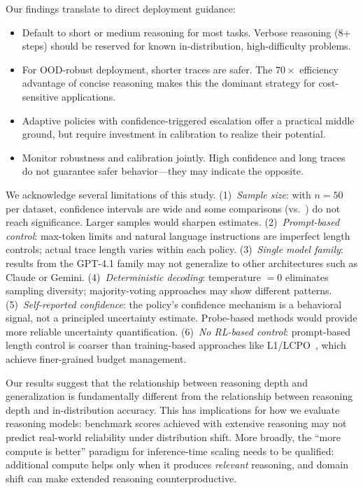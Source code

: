 Our findings translate to direct deployment guidance:
\begin{itemize}[leftmargin=*,itemsep=0pt,topsep=0pt]
    \item Default to short or medium reasoning for most tasks. Verbose reasoning (8+ steps) should be reserved for known in-distribution, high-difficulty problems.
    \item For OOD-robust deployment, shorter traces are safer. The $70\times$ efficiency advantage of concise reasoning makes this the dominant strategy for cost-sensitive applications.
    \item Adaptive policies with confidence-triggered escalation offer a practical middle ground, but require investment in calibration to realize their potential.
    \item Monitor robustness and calibration jointly. High confidence and long traces do not guarantee safer behavior---they may indicate the opposite.
\end{itemize}

We acknowledge several limitations of this study. (1)~\emph{Sample size}: with $n=50$ per dataset, confidence intervals are wide and some comparisons (\eg \pmedium vs.\ \plong) do not reach significance. Larger samples would sharpen estimates. (2)~\emph{Prompt-based control}: max-token limits and natural language instructions are imperfect length controls; actual trace length varies within each policy. (3)~\emph{Single model family}: results from the GPT-4.1 family may not generalize to other architectures such as Claude or Gemini. (4)~\emph{Deterministic decoding}: temperature $= 0$ eliminates sampling diversity; majority-voting approaches may show different patterns. (5)~\emph{Self-reported confidence}: the \padaptive policy's confidence mechanism is a behavioral signal, not a principled uncertainty estimate. Probe-based methods would provide more reliable uncertainty quantification. (6)~\emph{No RL-based control}: prompt-based length control is coarser than training-based approaches like L1/LCPO~\citep{aggarwal2025l1}, which achieve finer-grained budget management.

Our results suggest that the relationship between reasoning depth and generalization is fundamentally different from the relationship between reasoning depth and in-distribution accuracy. This has implications for how we evaluate reasoning models: benchmark scores achieved with extensive reasoning may not predict real-world reliability under distribution shift. More broadly, the ``more compute is better'' paradigm for inference-time scaling needs to be qualified: additional compute helps only when it produces \emph{relevant} reasoning, and domain shift can make extended reasoning counterproductive.

